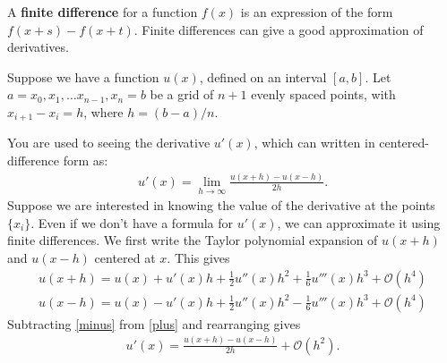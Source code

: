 \label{lab:finitedifference2}


A \textbf{finite difference} for a function $f(x)$ is an expression of the form $f(x+s)-f(x+t)$.
Finite differences can give a good approximation of derivatives.

Suppose we have a function $u(x)$, defined on an interval $[a,b]$.
Let $a = x_0, x_1, \ldots x_{n-1}, x_n=b$ be a grid of $n+1$ evenly spaced points, with $x_{i+1}-x_i = h$, where $h = (b-a)/n$.

You are used to seeing the derivative $u'(x)$, which can written in centered-difference form as:
\begin{align*}
u'(x)=\lim_{h\to\infty}\frac{u(x+h)-u(x-h)}{2h}.
 \end{align*}
Suppose we are interested in knowing the value of the derivative at the points $\{x_i\}$.
Even if we don't have a formula for $u'(x)$, we can approximate it using finite differences.
We first write the Taylor polynomial expansion of $u(x+h)$ and $u(x-h)$ centered at $x$.
This gives
\begin{align}
u(x+h)=u(x)+u'(x)h+\frac{1}{2}u''(x)h^2+\frac{1}{6}u'''(x)h^3+\mathcal{O}(h^4)\label{plus}\\
u(x-h)=u(x)-u'(x)h+\frac{1}{2}u''(x)h^2-\frac{1}{6}u'''(x)h^3+\mathcal{O}(h^4)\label{minus}
\end{align}
Subtracting \eqref{minus} from \eqref{plus} and rearranging gives
\begin{align*}
u'(x)=\frac{u(x+h)-u(x-h)}{2h}+\mathcal{O}(h^2).
\end{align*}

